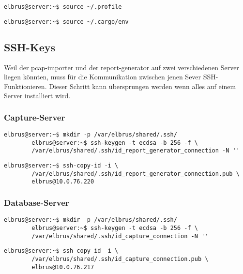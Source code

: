 \documentclass{article}
\begin{document}
	\begin{lstlisting}[caption={Laden der Variablen aus dem Terminal Profil.}]
		elbrus@server:~$ source ~/.profile
	\end{lstlisting}

	\begin{lstlisting}[caption={Hinzufügen des Befehls Cargo zu dem Pfad.}]
		elbrus@server:~$ source ~/.cargo/env
	\end{lstlisting}

	\newpage
	\subsection{SSH-Keys}
	
	Weil der pcap-importer und der report-generator auf zwei verschiedenen Server liegen könnten, muss für die Kommunikation zwischen jenen Sever SSH-Funktionieren.
	\newline\newline
	Dieser Schritt kann übersprungen werden wenn alles auf einem Server installiert wird.
	
	\subsubsection{Capture-Server}
	\begin{lstlisting}[caption={Anlegen der SSH-Keys.}]
		elbrus@server:~$ mkdir -p /var/elbrus/shared/.ssh/
		elbrus@server:~$ ssh-keygen -t ecdsa -b 256 -f \
		/var/elbrus/shared/.ssh/id_report_generator_connection -N ''
	\end{lstlisting}
	
	\begin{lstlisting}[caption={Übertragen der SSH-Keys auf den Database-Server.}]
		elbrus@server:~$ ssh-copy-id -i \
		/var/elbrus/shared/.ssh/id_report_generator_connection.pub \
		elbrus@10.0.76.220
	\end{lstlisting}
	
	\subsubsection{Database-Server}
	\begin{lstlisting}[caption={Anlegen der SSH-Keys.}]
		elbrus@server:~$ mkdir -p /var/elbrus/shared/.ssh/
		elbrus@server:~$ ssh-keygen -t ecdsa -b 256 -f \
		/var/elbrus/shared/.ssh/id_capture_connection -N ''
	\end{lstlisting}
	
	\begin{lstlisting}[caption={Übertragen der SSH-Keys auf den Capture-Server.}]
		elbrus@server:~$ ssh-copy-id -i \
		/var/elbrus/shared/.ssh/id_capture_connection.pub \
		elbrus@10.0.76.217
	\end{lstlisting}
	
\end{document}
